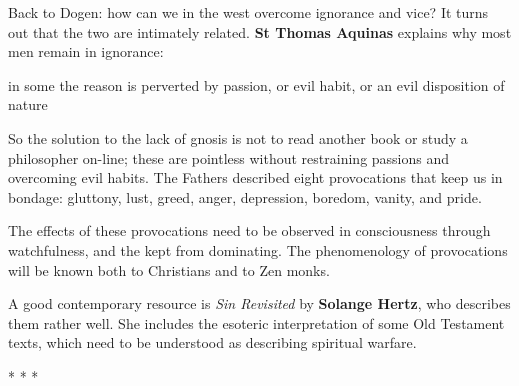 Back to Dogen: how can we in the west overcome ignorance and vice? It turns out that the two are intimately related. \textbf{St Thomas Aquinas} explains why most men remain in ignorance:

\begin{quotex}
in some the reason is perverted by passion, or evil habit, or an evil disposition of nature
\end{quotex}


So the solution to the lack of gnosis is not to read another book or study a philosopher on-line; these are pointless without restraining passions and overcoming evil habits. The Fathers described eight provocations that keep us in bondage: gluttony, lust, greed, anger, depression, boredom, vanity, and pride.

The effects of these provocations need to be observed in consciousness through watchfulness, and the kept from dominating. The phenomenology of provocations will be known both to Christians and to Zen monks.

A good contemporary resource is \emph{Sin Revisited} by \textbf{Solange Hertz}, who describes them rather well. She includes the esoteric interpretation of some Old Testament texts, which need to be understood as describing spiritual warfare.



\begin{center}* * *\end{center}

